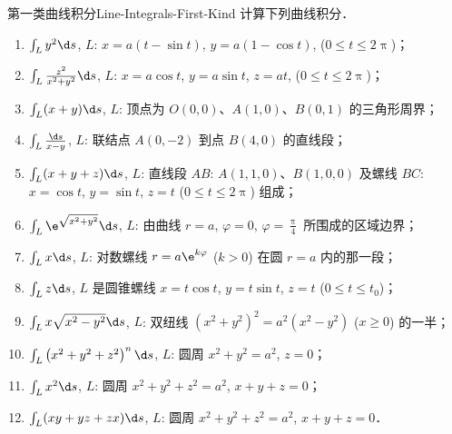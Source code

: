 \begin{problem}{第一类曲线积分}{Line-Integrals-First-Kind}
    计算下列曲线积分．
    \begin{enumerate}
        \item $\int_{L} y^{2} \d s$, $L$: $x=a(t-\sin t)$, $y=a(1-\cos t)$, ($0 \leqslant t \leqslant 2 \uppi$)；
        \item $\int_{L} \frac{z^{2}}{x^{2}+y^{2}} \d s$, $L$: $x=a \cos t$, $y=a \sin t$, $z=a t$, ($0 \leqslant t \leqslant 2 \uppi$)；
        \item $\int_{L}(x+y) \d s$, $L$: 顶点为 $O(0,0)$、$A(1,0)$、$B(0,1)$ 的三角形周界；
        \item $\int_{L} \frac{\d s}{x-y}$, $L$: 联结点 $A(0,-2)$ 到点 $B(4,0)$ 的直线段；
        \item $\int_{L}(x+y+z) \d s$, $L$: 直线段 $AB$: $A(1,1,0)$、$B(1,0,0)$ 及螺线 $BC$: $x=\cos t$, $y=\sin t$, $z=t$ ($0 \leqslant t \leqslant 2 \uppi$) 组成；
        \item $\int_{L} \e^{\sqrt{x^{2}+y^{2}}} \d s$, $L$: 由曲线 $r=a$, $\varphi=0$, $\varphi=\frac{\uppi}{4}$ 所围成的区域边界；
        \item $\int_{L} x \d s$, $L$: 对数螺线 $r=a \e^{k \varphi}$ ($k>0$) 在圆 $r=a$ 内的那一段；
        \item $\int_{L} z \d s$, $L$ 是圆锥螺线 $x=t \cos t$, $y=t \sin t$, $z=t$ ($0 \leqslant t \leqslant t_{0}$)；
        \item $\int_{L} x \sqrt{x^{2}-y^{2}} \d s$, $L$: 双纽线 $\left(x^{2}+y^{2}\right)^{2}=a^{2}\left(x^{2}-y^{2}\right)$ ($x \geqslant 0$) 的一半；
        \item $\int_{L}\left(x^{2}+y^{2}+z^{2}\right)^{n} \d s$, $L$: 圆周 $x^{2}+y^{2}=a^{2}$, $z=0$；
        \item $\int_{L} x^{2} \d s$, $L$: 圆周 $x^{2}+y^{2}+z^{2}=a^{2}$, $x+y+z=0$；
        \item $\int_{L}(x y+y z+z x) \d s$, $L$: 圆周 $x^{2}+y^{2}+z^{2}=a^{2}$, $x+y+z=0$．
    \end{enumerate}
\end{problem}

